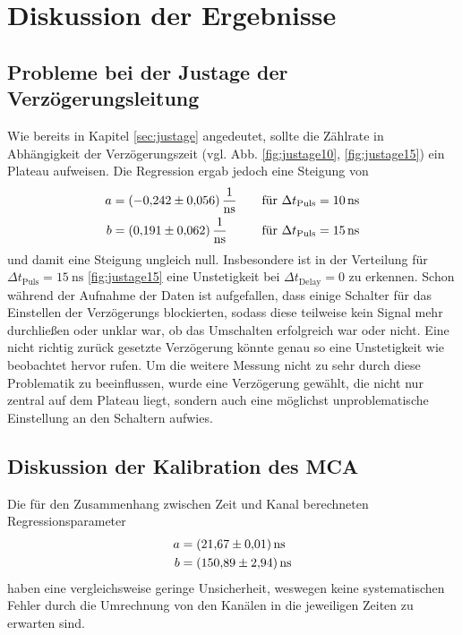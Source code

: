 \section{Diskussion der Ergebnisse}
\label{sec:Diskussion}

\subsection{Probleme bei der Justage der Verzögerungsleitung}
Wie bereits in Kapitel \ref{sec:justage} angedeutet, sollte die Zählrate in Abhängigkeit der Verzögerungszeit (vgl. Abb. \ref{fig:justage10}, \ref{fig:justage15})
ein Plateau aufweisen. Die Regression ergab jedoch eine Steigung von 
\begin{align*}
    a&=\SI{-0.242 \pm 0.056}{\per\nano\second} \quad &\text{für $\Delta t_{\text{Puls}}=\SI{10}{\nano\second}$}\\
    b&=\SI{0.191 \pm 0.062 }{\per\nano\second} \quad &\text{für $\Delta t_{\text{Puls}}=\SI{15}{\nano\second}$}
\end{align*}
und damit eine Steigung ungleich null. Insbesondere ist in der Verteilung für $\Delta t_{\text{Puls}}=\SI{15}{\nano\second}$ \ref{fig:justage15} eine 
Unstetigkeit bei $\Delta t_\text{Delay}=0$ zu erkennen. Schon während der Aufnahme der Daten ist aufgefallen, dass einige Schalter für das Einstellen der Verzögerungs
blockierten, sodass diese teilweise kein Signal mehr durchließen oder unklar war, ob das Umschalten erfolgreich war oder nicht. Eine nicht richtig zurück
gesetzte Verzögerung könnte genau so eine Unstetigkeit wie beobachtet hervor rufen. Um die weitere Messung nicht zu sehr durch diese Problematik zu beeinflussen,
wurde eine Verzögerung gewählt, die nicht nur zentral auf dem Plateau liegt, sondern auch eine möglichst unproblematische Einstellung an den Schaltern aufwies.

\subsection{Diskussion der Kalibration des MCA}
Die für den Zusammenhang zwischen Zeit und Kanal berechneten Regressionsparameter 
\begin{align*}
    a &= \SI{21.67 \pm 0.01}{\nano\second} \\ 
    b &= \SI{150.89 \pm 2.94}{\nano\second}
 \end{align*}
haben eine vergleichsweise geringe Unsicherheit, weswegen keine systematischen Fehler durch die Umrechnung von den Kanälen in die jeweiligen Zeiten zu erwarten sind. 

